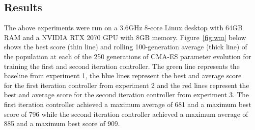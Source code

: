 \subsection{Results}

The above experiments were run on a 3.6GHz 8-core Linux desktop with 64GB RAM and a NVIDIA RTX 2070 GPU with 8GB memory. Figure~\ref{fig:wm} below shows the best score (thin line) and rolling 100-generation average (thick line) of the population at each of the 250 generations of CMA-ES parameter evolution for training the first and second iteration controller. The green line represents the baseline from experiment 1, the blue lines represent the best and average score for the first iteration controller from experiment 2 and the red lines represent the best and average score for the second iteration controller from experiment 3. The first iteration controller achieved a maximum average of 681 and a maximum best score of 796 while the second iteration controller achieved a maximum average of 885 and a maximum best score of 909.

